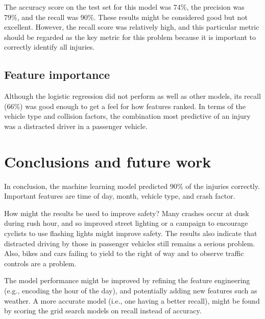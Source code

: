 \documentclass[twocolumn,oneside]{article}
\begin{document}
The accuracy score on the test set for this model was 74\%, the
precision was 79\%, and the recall was 90\%.  These results might be
considered good but not excellent.  However, the recall score was
relatively high, and this particular metric should be regarded as the
key metric for this problem because it is important to correctly
identify all injuries.

\subsection{Feature importance}

Although the logistic regression did not perform as well as other
models, its recall (66\%) was good enough to get a feel for how
features ranked.  In terms of the vehicle type and collision factors,
the combination most predictive of an injury was a distracted driver
in a passenger vehicle.


\section{Conclusions and future work}

In conclusion, the machine learning model predicted 90\% of the
injuries correctly.  Important features are time of day, month,
vehicle type, and crash factor.

How might the results be used to improve safety?  Many crashes occur
at dusk during rush hour, and so improved street lighting or a
campaign to encourage cyclists to use flashing lights might improve
safety.  The results also indicate that distracted driving by those in
passenger vehicles still remains a serious problem.  Also, bikes and
cars failing to yield to the right of way and to observe traffic
controls are a problem.

The model performance might be improved by refining the feature
engineering (e.g., encoding the hour of the day), and potentially
adding new features such as weather.  A more accurate model (i.e., one
having a better recall), might be found by scoring the grid search
models on recall instead of accuracy.
\end{document}
